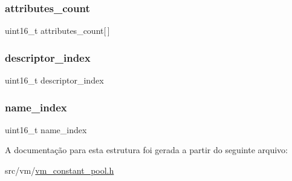 \subsubsection{\texorpdfstring{attributes\+\_\+count}{attributes\_count}}
{\footnotesize\ttfamily uint16\+\_\+t attributes\+\_\+count\mbox{[}$\,$\mbox{]}}

\mbox{\label{structvm__method__info__t_a042bbc76d835b82d27c1932431ee38d4}} 
\subsubsection{\texorpdfstring{descriptor\+\_\+index}{descriptor\_index}}
{\footnotesize\ttfamily uint16\+\_\+t descriptor\+\_\+index}

\mbox{\label{structvm__method__info__t_a898a74ada625e0b227dadb02901404e6}} 
\subsubsection{\texorpdfstring{name\+\_\+index}{name\_index}}
{\footnotesize\ttfamily uint16\+\_\+t name\+\_\+index}



A documentação para esta estrutura foi gerada a partir do seguinte arquivo\+:\begin{DoxyCompactItemize}
\item 
src/vm/\hyperlink{vm__constant__pool_8h}{vm\+\_\+constant\+\_\+pool.\+h}\end{DoxyCompactItemize}
